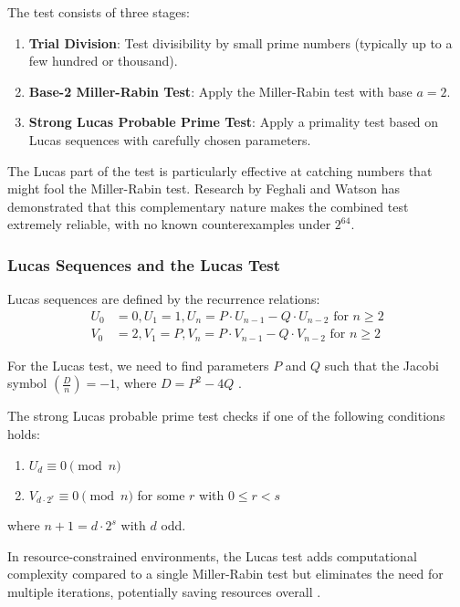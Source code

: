 The test consists of three stages:

\begin{enumerate}
    \item \textbf{Trial Division}: Test divisibility by small prime numbers (typically up to a few hundred or thousand).
    
    \item \textbf{Base-2 Miller-Rabin Test}: Apply the Miller-Rabin test with base $a = 2$.
    
    \item \textbf{Strong Lucas Probable Prime Test}: Apply a primality test based on Lucas sequences with carefully chosen parameters.
\end{enumerate}

The Lucas part of the test is particularly effective at catching numbers that might fool the Miller-Rabin test. Research by Feghali and Watson \cite{hardware_baillie} has demonstrated that this complementary nature makes the combined test extremely reliable, with no known counterexamples under $2^{64}$.

\subsubsection{Lucas Sequences and the Lucas Test}

Lucas sequences are defined by the recurrence relations:
\begin{align}
U_0 &= 0, U_1 = 1, U_n = P \cdot U_{n-1} - Q \cdot U_{n-2} \text{ for } n \geq 2 \\
V_0 &= 2, V_1 = P, V_n = P \cdot V_{n-1} - Q \cdot V_{n-2} \text{ for } n \geq 2
\end{align}

For the Lucas test, we need to find parameters $P$ and $Q$ such that the Jacobi symbol $\left( \frac{D}{n} \right) = -1$, where $D = P^2 - 4Q$ \cite{lucas1878}.

The strong Lucas probable prime test checks if one of the following conditions holds:
\begin{enumerate}
    \item $U_d \equiv 0 \pmod{n}$
    \item $V_{d \cdot 2^r} \equiv 0 \pmod{n}$ for some $r$ with $0 \leq r < s$
\end{enumerate}
where $n + 1 = d \cdot 2^s$ with $d$ odd.

In resource-constrained environments, the Lucas test adds computational complexity compared to a single Miller-Rabin test but eliminates the need for multiple iterations, potentially saving resources overall \cite{hardware_baillie, taxonomy_primality}.

